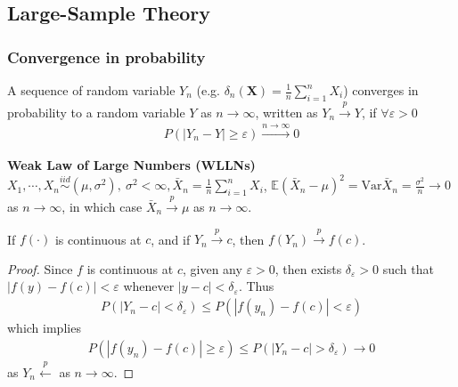 \subsection{Large-Sample Theory}
\subsubsection{Convergence in probability}
\begin{definition}
    A sequence of random variable $Y_n$ (e.g. $\delta_n(\boldsymbol{X})=\frac{1}{n}\sum_{i=1}^n{X_i}$) 
    converges in probability to a random variable $Y$ as $n\to\infty$,
    written as $Y_n\overset{p}{\longrightarrow}Y$,
    if $\forall{\varepsilon}>0$
    \begin{gather}
        P(|Y_n-Y|\geq \varepsilon)\overset{n\to\infty}{\longrightarrow}0
    \end{gather}
\end{definition}

\begin{example}
    \textbf{Weak Law of Large Numbers (WLLNs)}\\
    $X_1,\cdots,X_n\overset{iid}{\sim}(\mu,\sigma^2),~\sigma^2<\infty,\bar{X}_n=\frac{1}{n}\sum_{i=1}^n{X_i}$,
    $\mathbb{E}(\bar{X}_n-\mu)^2=\mathrm{Var}\bar{X}_n=\frac{\sigma^2}{n} \to 0$ as $n\to\infty$,
    in which case $\bar{X}_n\overset{p}{\longrightarrow}\mu$ as $n\to\infty$.
\end{example}

\begin{prop}
    If $f(\cdot)$ is continuous at $c$, and if $Y_n\overset{p}{\longrightarrow}c$, then $f(Y_n)\overset{p}{\longrightarrow}f(c)$.
\end{prop}
\begin{proof}
    Since $f$ is continuous at $c$, given any $\varepsilon > 0$, 
    then exists $\delta_\varepsilon > 0$ such that $|f(y)-f(c)|<\varepsilon$ 
    whenever $|y-c|<\delta_\varepsilon$. 
    Thus
    \begin{gather}
        P(|Y_n-c|<\delta_\varepsilon)\leq P(|f(y_n)-f(c)|<\varepsilon)
    \end{gather}
    which implies
    \begin{gather}
        P(|f(y_n)-f(c)|\geq\varepsilon) \leq P(|Y_n-c|>\delta_\varepsilon) \to 0
    \end{gather}
    as $Y_n\overset{p}{\longleftarrow}$ as $n\to\infty$.
\end{proof}

